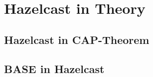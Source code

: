 
\section{Hazelcast in Theory} \label{sec:hazelcast-in-theory}
\todo{}
\subsection{Hazelcast in CAP-Theorem}
\todo{}
\subsection{BASE in Hazelcast}
\todo{}